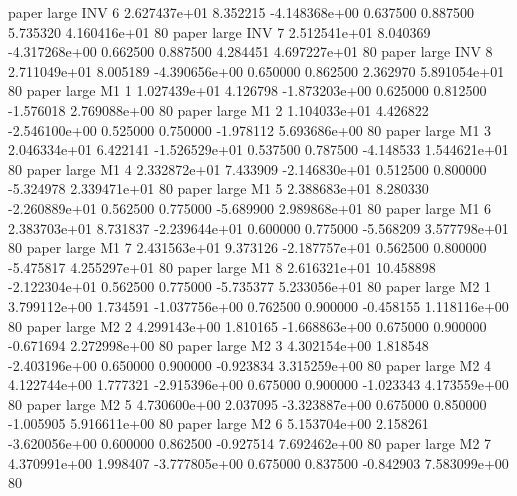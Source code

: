               paper      large      INV                 6 2.627437e+01      8.352215 -4.148368e+00 0.637500 0.887500       5.735320 4.160416e+01 80
              paper      large      INV                 7 2.512541e+01      8.040369 -4.317268e+00 0.662500 0.887500       4.284451 4.697227e+01 80
              paper      large      INV                 8 2.711049e+01      8.005189 -4.390656e+00 0.650000 0.862500       2.362970 5.891054e+01 80
              paper      large       M1                 1 1.027439e+01      4.126798 -1.873203e+00 0.625000 0.812500      -1.576018 2.769088e+00 80
              paper      large       M1                 2 1.104033e+01      4.426822 -2.546100e+00 0.525000 0.750000      -1.978112 5.693686e+00 80
              paper      large       M1                 3 2.046334e+01      6.422141 -1.526529e+01 0.537500 0.787500      -4.148533 1.544621e+01 80
              paper      large       M1                 4 2.332872e+01      7.433909 -2.146830e+01 0.512500 0.800000      -5.324978 2.339471e+01 80
              paper      large       M1                 5 2.388683e+01      8.280330 -2.260889e+01 0.562500 0.775000      -5.689900 2.989868e+01 80
              paper      large       M1                 6 2.383703e+01      8.731837 -2.239644e+01 0.600000 0.775000      -5.568209 3.577798e+01 80
              paper      large       M1                 7 2.431563e+01      9.373126 -2.187757e+01 0.562500 0.800000      -5.475817 4.255297e+01 80
              paper      large       M1                 8 2.616321e+01     10.458898 -2.122304e+01 0.562500 0.775000      -5.735377 5.233056e+01 80
              paper      large       M2                 1 3.799112e+00      1.734591 -1.037756e+00 0.762500 0.900000      -0.458155 1.118116e+00 80
              paper      large       M2                 2 4.299143e+00      1.810165 -1.668863e+00 0.675000 0.900000      -0.671694 2.272998e+00 80
              paper      large       M2                 3 4.302154e+00      1.818548 -2.403196e+00 0.650000 0.900000      -0.923834 3.315259e+00 80
              paper      large       M2                 4 4.122744e+00      1.777321 -2.915396e+00 0.675000 0.900000      -1.023343 4.173559e+00 80
              paper      large       M2                 5 4.730600e+00      2.037095 -3.323887e+00 0.675000 0.850000      -1.005905 5.916611e+00 80
              paper      large       M2                 6 5.153704e+00      2.158261 -3.620056e+00 0.600000 0.862500      -0.927514 7.692462e+00 80
              paper      large       M2                 7 4.370991e+00      1.998407 -3.777805e+00 0.675000 0.837500      -0.842903 7.583099e+00 80

